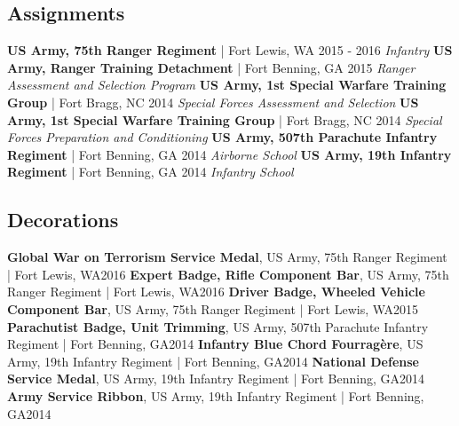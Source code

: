 \documentclass{article}
\begin{document}
    \subsection*{Assignments}
        \textbf{US Army, 75th Ranger Regiment} | Fort Lewis, WA \hfill{2015 - 2016}\newline
        \textit{Infantry}\newline\newline
        \textbf{US Army, Ranger Training Detachment} | Fort Benning, GA \hfill{2015}\newline
        \textit{Ranger Assessment and Selection Program}\newline\newline
        \textbf{US Army, 1st Special Warfare Training Group} | Fort Bragg, NC \hfill{2014}\newline
        \textit{Special Forces Assessment and Selection}\newline\newline
        \textbf{US Army, 1st Special Warfare Training Group} | Fort Bragg, NC \hfill{2014}\newline
        \textit{Special Forces Preparation and Conditioning}\newline\newline
        \textbf{US Army, 507th Parachute Infantry Regiment} | Fort Benning, GA \hfill{2014}\newline
        \textit{Airborne School}\newline\newline
        \textbf{US Army, 19th Infantry Regiment} | Fort Benning, GA \hfill{2014}\newline
        \textit{Infantry School}
    \subsection*{Decorations}
        \textbf{Global War on Terrorism Service Medal}, US Army, 75th Ranger Regiment | Fort Lewis, WA\hfill{2016}\newline
        \textbf{Expert Badge, Rifle Component Bar}, US Army, 75th Ranger Regiment | Fort Lewis, WA\hfill{2016}\newline
        \textbf{Driver Badge, Wheeled Vehicle Component Bar}, US Army, 75th Ranger Regiment | Fort Lewis, WA\hfill{2015}\newline
        \textbf{Parachutist Badge, Unit Trimming}, US Army, 507th Parachute Infantry Regiment | Fort Benning, GA\hfill{2014}\newline
        \textbf{Infantry Blue Chord Fourragère}, US Army, 19th Infantry Regiment | Fort Benning, GA\hfill{2014}\newline
        \textbf{National Defense Service Medal}, US Army, 19th Infantry Regiment | Fort Benning, GA\hfill{2014}\newline
        \textbf{Army Service Ribbon}, US Army, 19th Infantry Regiment | Fort Benning, GA\hfill{2014}
\end{document}
